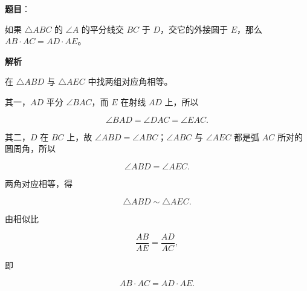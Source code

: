 \begin{answer}

\textbf{题目}：

如果 $\triangle ABC$ 的 $\angle A$ 的平分线交 $BC$ 于 $D$，交它的外接圆于 $E$，那么 $AB\cdot AC=AD\cdot AE$。
\nopagebreak[4]
\begin{center}\end{center}
\nopagebreak[4]
\textbf{解析}
\nopagebreak[4]
\begin{center}\end{center}
\nopagebreak[4]
在 $\triangle ABD$ 与 $\triangle AEC$ 中找两组对应角相等。

其一，$AD$ 平分 $\angle BAC$，而 $E$ 在射线 $AD$ 上，所以

\nopagebreak[4]
\[
\angle BAD=\angle DAC=\angle EAC.
\]

其二，$D$ 在 $BC$ 上，故 $\angle ABD=\angle ABC$；$\angle ABC$ 与 $\angle AEC$ 都是弧 $AC$ 所对的圆周角，所以

\nopagebreak[4]
\[
\angle ABD=\angle AEC.
\]

两角对应相等，得

\nopagebreak[4]
\[
\triangle ABD\sim\triangle AEC.
\]

由相似比

\nopagebreak[4]
\[
\frac{AB}{AE}=\frac{AD}{AC},
\]

即

\nopagebreak[4]
\[
AB\cdot AC=AD\cdot AE.
\]


\end{answer}
